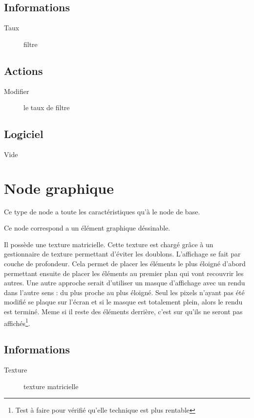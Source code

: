 \documentclass[11pt, a4paper]{article}
\begin{document}
\subsection{Informations}
\begin{description}
\item[Taux] filtre
\end{description}

\subsection{Actions}
\begin{description}
\item[Modifier] le taux de filtre
\end{description}

\subsection{Logiciel}
Vide

\section{Node graphique}
Ce type de node a toute les caractéristiques qu'à le node de base.

Ce node correspond a un élément graphique déssinable.

Il possède une texture matricielle. Cette texture est chargé grâce à un gestionnaire de texture permettant d'éviter les doublons.
L'affichage se fait par couche de profondeur. Cela permet de placer les éléments le plus éloigné d'abord permettant ensuite de placer les éléments au premier plan qui vont recouvrir les autres. Une autre approche serait d'utiliser un masque d'affichage avec un rendu dans l'autre sens : du plus proche au plus éloigné. Seul les pixels n'ayant pas été modifié se plaque sur l'écran et si le masque est totalement plein, alors le rendu est terminé. Meme si il reste des éléments derrière, c'est sur qu'ils ne seront pas affichés\footnote{Test à faire pour vérifié qu'elle technique est plus rentable}.

\subsection{Informations}
\begin{description}
\item[Texture] texture matricielle
\end{description}
\end{document}
